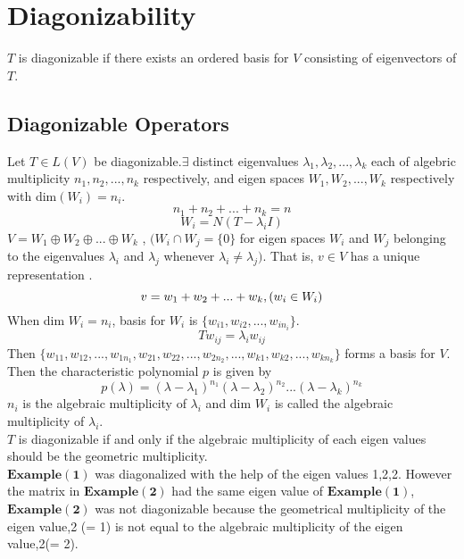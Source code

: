\documentclass[12pt]{article}
\theoremstyle{definition}
\begin{document}
	  \section{Diagonizability}
	  $T$ is diagonizable if there exists an ordered basis for $V$ consisting of eigenvectors of $T$.
	  \subsection{Diagonizable Operators} 
	  Let $T \in L(V)$ be diagonizable.$\exists$ distinct eigenvalues $\lambda_{1},\lambda_{2},...,\lambda_{k}$ each of algebric multiplicity $n_1,n_2,...,n_k$ respectively, and eigen spaces $W_1,W_2,...,W_k$ respectively with dim$(W_i) = n_i.$
	  $$n_1+n_2+...+n_k = n$$
	  $$W_i = N(T-\lambda_i I)$$
	  $V = W_1\oplus W_2\oplus...\oplus W_k$ ,\space 
	  $(W_i\cap W_j =\{0\}$ for eigen spaces $W_i$ and $W_j$ belonging to the eigenvalues $\lambda_{i}$ and $\lambda_{j}$ whenever $\lambda_{i} \neq \lambda_{j}).$
	  That is, $v \in V$ has a unique representation
	 .
	 $$ v = w_1+w_2+...+w_k , \space (w_i\in W_i)$$
	 When dim $W_i = n_i$, basis for $W_i$ is $\{w_{i1},w_{i2},...,w_{in_i}\}$.
	 $$Tw_{ij} = \lambda_{i}w_{ij}$$
	 Then $\{w_{11},w_{12},...,w_{1n_1},w_{21},w_{22},...,w_{2n_2},...,w_{k1},w_{k2},...,w_{kn_k}\}$ forms a basis for $V$.\\
	 Then the characteristic polynomial $p$ is given by $$p(\lambda)=(\lambda-\lambda_{1})^{n_1}(\lambda-\lambda_{2})^{n_2}...(\lambda-\lambda_{k})^{n_k}$$
	 $n_i$ is the algebraic multiplicity of $\lambda_{i}$ and dim $W_i$ is called the algebraic multiplicity of $\lambda_{i}$.\\
	 $T$ is diagonizable if and only if the algebraic multiplicity of each eigen values should be the geometric multiplicity.\\
	 $\mathbf{Example(1)}$ was diagonalized with the help of the eigen values 1,2,2. However the matrix in $\mathbf{Example(2)}$ had the same eigen value of $\mathbf{Example(1)}$,
	  $\mathbf{Example(2)}$ was not diagonizable because the geometrical multiplicity of the eigen value,2 (= 1) is not equal to the algebraic multiplicity of the eigen value,2(= 2).
	 \\
	 
\end{document}
